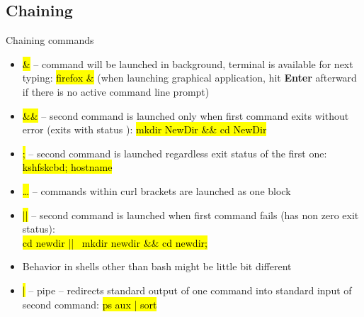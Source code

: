 \documentclass[compress, ucs, xelatex, 11pt, xcolor=svgnames,
  hyperref={
    bookmarks=true,
    unicode=true,
    colorlinks=true,
    pdftitle={Linux, command line and MetaCentrum},
    plainpages=false,
    pdfauthor={Vojtech Zeisek},
    pdfsubject={Course about use of Linux command line, writing shell scripts and using MetaCentrum of CESNET},
    pdfcreator={XeLaTeX},
    pdfkeywords={Linux, GNU, BASH, shell, command line, MetaCentrum},
    linkcolor=Red,
    anchorcolor=Blue,
    citecolor=Purple,
    filecolor=DodgerBlue,
    menucolor=DarkOrchid,
    urlcolor=DeepSkyBlue,
    pdftex},
  url={hyphens, lowtilde} %
  ]{beamer}
\renewcommand{\texttt}[1]{\hl{\ttfamily #1}}
\begin{document}
\subsection{Chaining}

\begin{frame}{Chaining commands}
\begin{itemize}
  \item \alert{\texttt{\&}} -- command will be launched in background, terminal is available for next typing: \texttt{firefox \&} (when launching graphical application, hit \textbf{Enter} afterward if there is no active command line prompt)
  \item \alert{\texttt{\&\&}} -- second command is launched only when first command exits without error (exits with status \texttt{0}): \texttt{mkdir NewDir \&\& cd NewDir}
  \item \alert{\texttt{;}} -- second command is launched regardless exit status of the first one: \texttt{kshfskcbd; hostname}
  \item \alert{\texttt{\textbraceleft\ldots\textbraceright}} -- commands within curl brackets are launched as one block
  \item \alert{\texttt{||}} -- second command is launched when first command fails (has non zero exit status):\\\texttt{cd newdir || \textbraceleft~mkdir newdir \&\& cd newdir; \textbraceright}
  \item Behavior in shells other than bash might be little bit different
  \item \alert{\texttt{|}} -- pipe -- redirects standard output of one command into standard input of second command: \texttt{ps aux | sort}
\end{itemize}
\end{frame}
\end{document}

